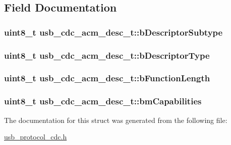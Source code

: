 \subsection{\-Field \-Documentation}
\hypertarget{structusb__cdc__acm__desc__t_a3c39791b6ae51bfa6730a6fc7094c04b}{
\subsubsection[{b\-Descriptor\-Subtype}]{\setlength{\rightskip}{0pt plus 5cm}uint8\-\_\-t {\bf usb\-\_\-cdc\-\_\-acm\-\_\-desc\-\_\-t\-::b\-Descriptor\-Subtype}}}
\label{structusb__cdc__acm__desc__t_a3c39791b6ae51bfa6730a6fc7094c04b}
\hypertarget{structusb__cdc__acm__desc__t_ac3fc0045813e83d431d42ed0c6d8b374}{
\subsubsection[{b\-Descriptor\-Type}]{\setlength{\rightskip}{0pt plus 5cm}uint8\-\_\-t {\bf usb\-\_\-cdc\-\_\-acm\-\_\-desc\-\_\-t\-::b\-Descriptor\-Type}}}
\label{structusb__cdc__acm__desc__t_ac3fc0045813e83d431d42ed0c6d8b374}
\hypertarget{structusb__cdc__acm__desc__t_ae803c98292de979d7c7345fa92b80ad0}{
\subsubsection[{b\-Function\-Length}]{\setlength{\rightskip}{0pt plus 5cm}uint8\-\_\-t {\bf usb\-\_\-cdc\-\_\-acm\-\_\-desc\-\_\-t\-::b\-Function\-Length}}}
\label{structusb__cdc__acm__desc__t_ae803c98292de979d7c7345fa92b80ad0}
\hypertarget{structusb__cdc__acm__desc__t_af37f070f757a7ea8f48c879c1865f54f}{
\subsubsection[{bm\-Capabilities}]{\setlength{\rightskip}{0pt plus 5cm}uint8\-\_\-t {\bf usb\-\_\-cdc\-\_\-acm\-\_\-desc\-\_\-t\-::bm\-Capabilities}}}
\label{structusb__cdc__acm__desc__t_af37f070f757a7ea8f48c879c1865f54f}


\-The documentation for this struct was generated from the following file\-:\begin{DoxyCompactItemize}
\item 
\hyperlink{usb__protocol__cdc_8h}{usb\-\_\-protocol\-\_\-cdc.\-h}\end{DoxyCompactItemize}

